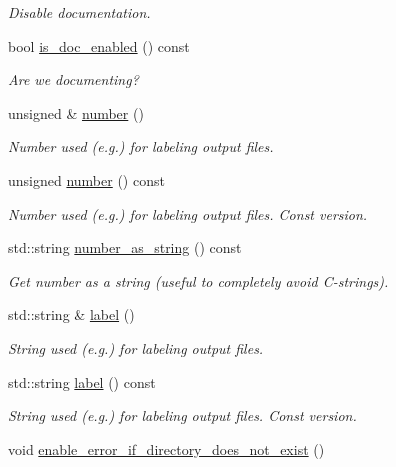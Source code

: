 \begin{DoxyCompactItemize}
\begin{DoxyCompactList}\small\item\em Disable documentation. \end{DoxyCompactList}\item 
bool \hyperlink{classoomph_1_1DocInfo_a2ce90cf54f24b4ab523c624031fbb76b}{is\+\_\+doc\+\_\+enabled} () const
\begin{DoxyCompactList}\small\item\em Are we documenting? \end{DoxyCompactList}\item 
unsigned \& \hyperlink{classoomph_1_1DocInfo_af27224b25da5b758442753f0947e62d4}{number} ()
\begin{DoxyCompactList}\small\item\em Number used (e.\+g.) for labeling output files. \end{DoxyCompactList}\item 
unsigned \hyperlink{classoomph_1_1DocInfo_a2a09b3c3e22fd874570ffc97b0610874}{number} () const
\begin{DoxyCompactList}\small\item\em Number used (e.\+g.) for labeling output files. Const version. \end{DoxyCompactList}\item 
std\+::string \hyperlink{classoomph_1_1DocInfo_acb66c97dad89c6e9fb6334e9ac530093}{number\+\_\+as\+\_\+string} () const
\begin{DoxyCompactList}\small\item\em Get number as a string (useful to completely avoid C-\/strings). \end{DoxyCompactList}\item 
std\+::string \& \hyperlink{classoomph_1_1DocInfo_a77320f779fab3075b36321aea72dc466}{label} ()
\begin{DoxyCompactList}\small\item\em String used (e.\+g.) for labeling output files. \end{DoxyCompactList}\item 
std\+::string \hyperlink{classoomph_1_1DocInfo_a1814ba7e28fadb03a8a5387103ec38a2}{label} () const
\begin{DoxyCompactList}\small\item\em String used (e.\+g.) for labeling output files. Const version. \end{DoxyCompactList}\item 
void \hyperlink{classoomph_1_1DocInfo_aaf51ae312c8e7726ddf1888f37f44433}{enable\+\_\+error\+\_\+if\+\_\+directory\+\_\+does\+\_\+not\+\_\+exist} ()

\end{DoxyCompactItemize}
